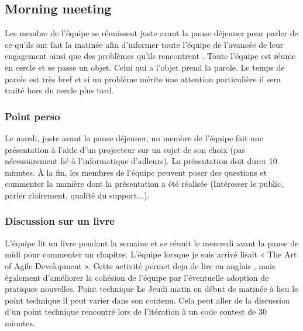 \subsection{Morning meeting}
Les membre de l'équipe se réunissent juste avant la pause déjeuner pour parler de ce qu'ils ont fait la matinée afin d'informer toute l'équipe de l'avancée de leur engagement ainsi que des problèmes qu'ils rencontrent . Toute l'équipe est réunie en cercle et se passe un objet. Celui qui a l'objet prend la parole. Le temps de parole est très bref et si un problème mérite une attention particulière il sera traité hors du cercle plus tard.

\subsubsection{Point perso}
Le mardi, juste avant la pause déjeuner, un membre de l'équipe fait une présentation à l'aide d'un projecteur sur un sujet de son choix (pas nécessairement lié à l'informatique d'ailleurs). La présentation doit durer 10 minutes. \`A la fin, les membres de l'équipe peuvent poser des questions et commenter la manière dont la présentation a été réalisée (Intéresser le public, parler clairement, qualité du support...).

%


\subsubsection{Discussion sur un livre}
L'équipe lit un livre pendant la semaine et se réunit le mercredi avant la pause de midi pour commenter un chapitre. L'équipe lorsque je suis arrivé lisait « The Art of Agile Development ». Cette activité permet deja de lire en anglais , mais également d'améliorer la cohésion de l'équipe par l'éventuelle adoption de pratiques nouvelles.
Point technique
Le Jeudi matin en début de matinée à lieu le point technique il peut varier dans son contenu. Cela peut aller de la discussion d'un point technique rencontré lors de l'itération à un code contest de 30 minutes.